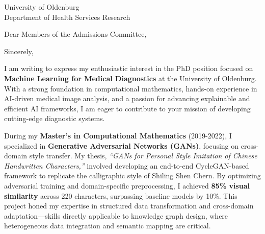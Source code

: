 \documentclass[11pt,a4paper, final]{moderncv}
\begin{document}
{University of Oldenburg\\
Department of Health Services Research\\
}
\date{\today}
\opening{Dear Members of the Admissions Committee,}
\closing{Sincerely,}
\makelettertitle
\thispagestyle{empty}
\pagestyle{empty}
I am writing to express my enthusiastic interest in the PhD position focused on 
\textbf{Machine Learning for Medical Diagnostics} at the University of Oldenburg. 
With a strong foundation in computational mathematics, 
hands-on experience in AI-driven medical image analysis, 
and a passion for advancing explainable and efficient AI frameworks, 
I am eager to contribute to your mission of developing cutting-edge diagnostic systems.

During my \textbf{Master's in Computational Mathematics} (2019-2022), 
I specialized in \textbf{Generative Adversarial Networks (GANs)}, 
focusing on cross-domain style transfer. 
My thesis, \emph{``GANs for Personal Style Imitation of Chinese Handwritten Characters,''} 
involved developing an end-to-end CycleGAN-based framework to replicate the calligraphic style of Shiling Shen Chern. 
By optimizing adversarial training and domain-specific preprocessing, 
I achieved \textbf{85\% visual similarity} across 220 characters, surpassing baseline models by 10\%. 
This project honed my expertise in structured data transformation and cross-domain adaptation—skills directly applicable to knowledge graph design, where heterogeneous data integration and semantic mapping are critical.
\end{document}
